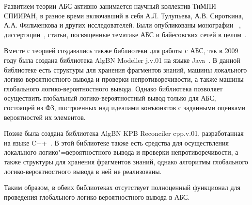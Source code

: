 Развитием теории АБС активно занимается научный коллектив ТиМПИ СПИИРАН, в разное время включавший в себя А.Л. Тулупьева, А.В. Сироткина, А.А. Фильченкова и других исследователей. Были опубликованы монографии ~\cite{109, 1, 85}, диссертации~\cite{84, 184, 284}, статьи, посвященные тематике АБС и байесовских сетей в целом~\cite{94}.

Вместе с теорией создавались также библиотеки для работы с АБС, так в 2009 году была создана библиотека AlgBN Modeller j.v.01 на языке Java~\cite{124, 123, 122}. В данной библиотеке есть структуры для хранения фрагментов знаний, машины локального логико-вероятностного вывода и проверки непротиворечивости, а также машины глобального логико-вероятностного вывода. Однако библиотека позволяет осуществить глобальный логико-вероятностный вывод только для АБС, состоящей из ФЗ, построенных над идеалами конъюнктов с заданными оценками вероятностей их элементов.

Позже была создана библиотека AlgBN KPB Reconciler cpp.v.01, разработанная на языке C++~\cite{81}. В этой библиотеке также есть средства для осуществления локального логико"=вероятностного вывода и проверки непротиворечивости, а также структуры для хранения фрагментов знаний, однако алгоритмы глобального логико-вероятностного вывода в ней не реализованы.

Таким образом, в обеих библиотеках отсутствует полноценный функционал для проведения глобального логико-вероятностного вывода в АБС.
